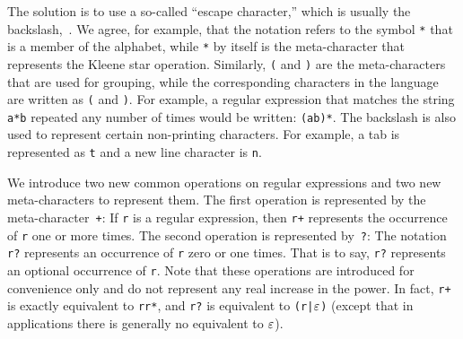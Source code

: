 The solution is to use a so-called ``escape character,'' which is
usually the backslash,~\texttt{\bk}.  We agree, for example, that the notation
\texttt{\bk*} refers to the symbol \texttt{*} that is a member of
the alphabet, while \texttt{*} by itself is the meta-character
that represents the Kleene star operation.  Similarly,
\texttt{(} and \texttt{)} are the meta-characters that are used
for grouping, while the corresponding characters in the language
are written as \texttt{\bk(} and \texttt{\bk)}.  For example,
a regular expression that matches the string \texttt{a*b} repeated
any number of times would be written: \texttt{(a\bk*b)*}.
The backslash is also used to represent certain non-printing
characters.  For example, a tab is represented as \texttt{\bk t}
and a new line character is \texttt{\bk n}.


We introduce two new common operations on regular expressions and two
new meta-characters to represent them.
The first operation is represented by the meta-character~\texttt{+}:
If \texttt{r} is a regular expression, then \texttt{r+} represents the
occurrence of \texttt{r} one or more times.  The second operation
is represented by~\texttt{?}: The notation \texttt{r?} represents an occurrence of \texttt{r} 
zero or one times.  That is to say, \texttt{r?} represents an optional 
occurrence of \texttt{r}.  Note that these operations are introduced
for convenience only and do not represent any real increase
in the power.  In fact, \texttt{r+} is exactly equivalent to
\texttt{rr*}, and \texttt{r?} is equivalent to \texttt{(r|$\varepsilon$)} 
(except that in applications there is generally no equivalent to $\varepsilon$).

